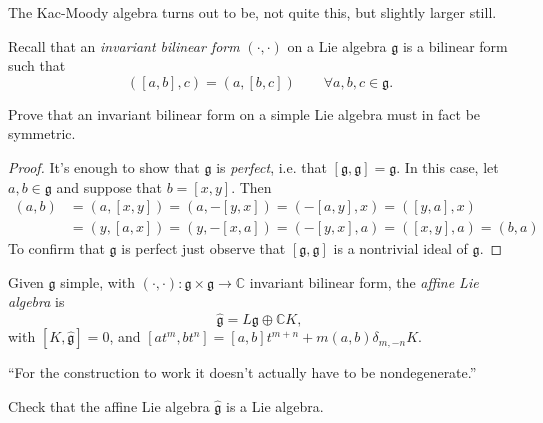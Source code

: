 The Kac-Moody algebra turns out to be, not
quite this, but slightly larger
still.

Recall that an {\it invariant bilinear form}
$(\cdot,\cdot)$ on a Lie algebra
$\mathfrak{g}$ is a bilinear form such that
\begin{equation}
\label{equation-invariant-bilinear-form}
([a,b],c)=(a,[b,c])\qquad \forall a,b,c \in
\mathfrak{g}.
\end{equation}

\begin{exercise}
\label{exercise-invar-bilin-form-simpl}
Prove that an invariant bilinear form on a
simple Lie algebra must in fact be
symmetric.
\end{exercise}

\begin{proof}
It's enough to show that $\mathfrak{g}$ is
{\it perfect}, i.e. that
$[\mathfrak{g},\mathfrak{g}]=\mathfrak{g}$.
In this
case, let $a,b \in \mathfrak{g}$ and suppose
that $b=[x,y]$. Then
$$
\begin{aligned}
(a,b)&=(a,[x,y])=(a,-[y,x])=(-[a,y],x)=([y,a]
,x)\\
&=(y,[a,x])=(y,-[x,a])=(-[y,x],a)=([x,y],a)=
(b,a)
\end{aligned}
$$
To confirm that $\mathfrak{g}$ is perfect
just observe that
$[\mathfrak{g},\mathfrak{g}]$ is a nontrivial
ideal of $\mathfrak{g}$.
\end{proof}

\begin{definition}
\label{definition-affine-Lie-algebra}
Given $\mathfrak{g}$ simple, with
$(\cdot,\cdot):\mathfrak{g} \times
\mathfrak{g} \to \mathbb{C}$
invariant bilinear form, the {\it affine Lie
algebra} is
$$
\hat{\mathfrak{g}}=L\mathfrak{g} \oplus
\mathbb{C}K,
$$
with $[K,\hat{\mathfrak{g}}]=0$, and
$[at^m,bt^n]=[a,b]t^{m+n}+m(a,b)\delta_{m,-n}
K$.
\end{definition}

``For the construction to work it doesn't
actually have to be nondegenerate.''

\begin{exercise}
\label{exercise-affin-lie-algeb-lie-algeb}
Check that the affine Lie algebra
$\hat{\mathfrak{g}}$ is a Lie algebra.
\end{exercise}

